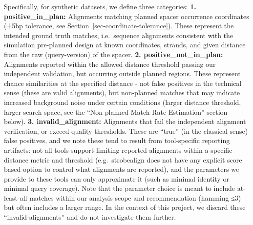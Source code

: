 \documentclass[
]{article}
\begin{document}
Specifically, for synthetic datasets, we define three categories:
\textbf{1. positive\_in\_plan:} Alignments matching planned spacer
occurrence coordinates (±5bp tolerance, see
Section~\ref{sec-coordinate-tolerance}). These represent the intended
ground truth matches, i.e.~sequence alignments consistent with the
simulation pre-planned design at known coordinates, strands, and given
distance from the raw (query-version) of the spacer. \textbf{2.
positive\_not\_in\_plan:} Alignments reported within the allowed
distance threshold passing our independent validation, but occurring
outside planned regions. These represent chance similarities at the
specified distance - not false positives in the technical sense (these
are valid alignments), but non-planned matches that may indicate
increased background noise under certain conditions (larger distance
threshold, larger search space, see the ``Non-planned Match Rate
Estimation'' section below). \textbf{3. invalid\_alignment:} Alignments
that fail the independent alignment verification, or exceed quality
thresholds. These are ``true'' (in the classical sense) false positives,
and we note these tend to result from tool-specific reporting artifacts:
not all tools support limiting reported alignments within a specific
distance metric and threshold (e.g.~strobealign does not have any
explicit score based option to control what alignments are reported),
and the parameters we provide to these tools can only approximate it
(such as minimal identity or minimal query coverage). Note that the
parameter choice is meant to include at-least all matches within our
analysis scope and recommendation (hamming ≤3) but often includes a
larger range. In the context of this project, we discard these
``invalid-alignments'' and do not investigate them further.
\end{document}
